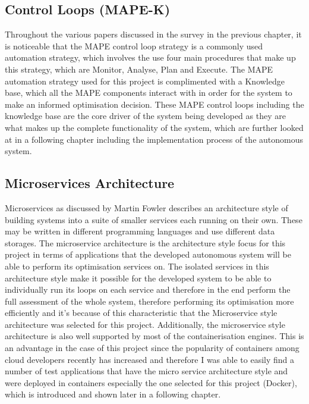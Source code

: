 \subsection{Control Loops (MAPE-K)}
Throughout the various papers discussed in the survey \cite{qu2018auto} in the previous chapter, it is noticeable that the MAPE control loop strategy is a commonly used automation strategy, which involves the use four main procedures that make up this strategy, which are Monitor, Analyse, Plan and Execute. The MAPE automation strategy \cite{kephart2003vision} used for this project is complimented with a Knowledge base, which all the MAPE components interact with in order for the system to make an informed optimisation decision. These MAPE control loops including the knowledge base are the core driver of the system being developed as they are what makes up the complete functionality of the system, which are further looked at in a following chapter including the implementation process of the autonomous system.

\subsection{Microservices Architecture}
Microservices as discussed by Martin Fowler \cite{Microservices} describes an architecture style of building systems into a suite of smaller services each running on their own. These may be written in different programming languages and use different data storages. The microservice architecture is the architecture style focus for this project in terms of applications that the developed autonomous system will be able to perform its optimisation services on. The isolated services in this architecture style make it possible for the developed system to be able to individually run its loops on each service and therefore in the end perform the full assessment of the whole system, therefore performing its optimisation more efficiently and it's because of this characteristic that the Microservice style architecture was selected for this project. Additionally, the microservice style architecture is also well supported by most of the containerisation engines. This is an advantage in the case of this project since the popularity of containers among cloud developers recently has increased and therefore I was able to easily find a number of test applications that have the micro service architecture style and were deployed in containers especially the one selected for this project (Docker), which is introduced and shown later in a following chapter. 

